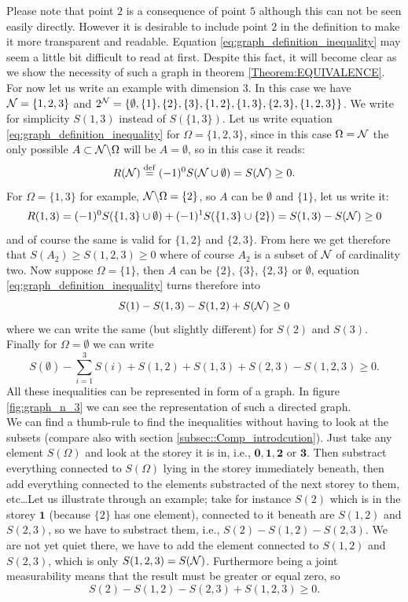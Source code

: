 \documentclass[10pt, a4paper]{amsart}
\begin{document}
Please note that point $2$ is a consequence of point $5$ although this can not be seen easily directly. However it is desirable to include point $2$ in the definition to make it more transparent and readable. Equation \ref{eq:graph_definition_inequality} may seem a little bit difficult to read at first. Despite this fact, it will become clear as we show  the necessity of such a graph in theorem \ref{Theorem:EQUIVALENCE}. For now let us write an example with dimension $3$. In this case we have $\mathcal{N} = \{1,2,3\}$ and $2^{\mathcal{N}} = \{\emptyset ,\{1\},\{2\},\{3\},\{1,2\},\{1,3\},\{2,3\},\{1,2,3\}  \}$.  We write for simplicity $S(1,3)$ instead of $S(\{1,3\})$. Let us write equation \ref{eq:graph_definition_inequality} for $\Omega = \{1,2,3\}$, since in this case $\Omega = \mathcal{N}$ the only possible $A\subset \mathcal{N}\backslash \Omega$ will be $A = \emptyset$, so in this case it reads:
$$
R(\mathcal{N})  \overset{\mathrm{def}}{=} (-1)^{0}S(\mathcal{N}\cup \emptyset ) = S(\mathcal{N}) \geq 0. 
$$
For $\Omega = \{1,3\}$ for example, $\mathcal{N}\backslash \Omega = \{2\}$, so $A$ can be $\emptyset$ and $\{1\}$, let us write it:
$$
R(1,3) = (-1)^{0}S(\{1,3\}\cup \emptyset ) + (-1)^{1}S(\{1,3\}\cup \{2\}) = S(1,3) - S(\mathcal{N}) \geq 0
$$
and of course the same is valid for $\{1,2\}$ and $\{2,3\}$. From here we get therefore that $S(A_{2}) \geq S(1,2,3) \geq 0$ where of course $A_{2}$ is a subset of $\mathcal{N}$ of cardinality two. Now suppose $\Omega = \{1\}$, then $A$ can be $\{2\}$, $\{3\}$, $\{2,3\}$ or $\emptyset$, equation \ref{eq:graph_definition_inequality} turns therefore into 
$$
S(1) - S(1,3) - S(1,2) + S(\mathcal{N} ) \geq 0
$$
where we can write the same (but slightly different) for $S(2)$ and $S(3)$. Finally for $\Omega = \emptyset$ we can write
$$
S(\emptyset ) - \sum_{i=1}^{3}S(i) + S(1,2)+ S(1,3) + S(2,3) - S(1,2,3) \geq 0.
$$
All these inequalities can be represented in form of a graph. In figure \ref{fig:graph_n_3} we can see the representation of such a directed graph. \\


We can find a thumb-rule to find the inequalities without having to look at the subsets (compare also with section \ref{subsec::Comp_introdcution}). Just take any element $S(\Omega)$ and look at the storey it is in, i.e., $\mathbf{0}, \mathbf{1}, \mathbf{2}$ or $\mathbf{3}$. Then substract everything connected to $S(\Omega)$  lying in the storey immediately beneath, then add everything connected to the elements substracted of the next storey to them, etc\ldots Let us illustrate through an example; take for instance $S(2)$ which is in the storey $\mathbf{1}$ (because $\{2\}$ has one element), connected to it beneath are $S(1,2)$ and $S(2,3)$, so we have to substract them, i.e., $S(2) - S(1,2)-S(2,3)$. We are not yet quiet there, we have to add the element connected to $S(1,2)$ and $S(2,3)$, which is only $S(1,2,3) = S(\mathcal{N})$. Furthermore being a joint measurability means that the result must be greater or equal zero, so 
$$
S(2) - S(1,2)-S(2,3) + S(1,2,3) \geq 0.
$$
\end{document}
